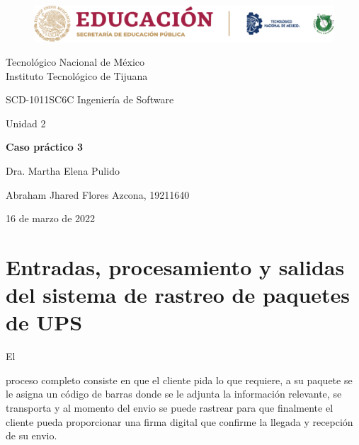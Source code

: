 \documentclass[stu, 12pt, letterpaper, donotrepeattitle, floatsintext, natbib]{apa7}
\begin{document}
    \begin{titlepage}
        \begin{figure}[ht]
            \centering
            \includegraphics[width=15cm]{logosITT.png}
        \end{figure}
        \centering
        {\Large Tecnológico Nacional de México\\Instituto Tecnológico de Tijuana\par}
        \vspace{1cm}
        {\Large SCD-1011SC6C Ingeniería de Software\par}
        \vspace{1cm}
        {\Large Unidad 2\par}
        \vspace{2cm}
        {\Large\bfseries Caso práctico 3\par}
        \vspace{2cm}
        {\large Dra. Martha Elena Pulido\par}
        \vfill
            {\large Abraham Jhared Flores Azcona, 19211640\par}
        \vfill
        {\large 16 de marzo de 2022}
    \end{titlepage}

\renewcommand\contentsname{Contenido}
\tableofcontents

\newpage
\section{Entradas, procesamiento y salidas del sistema de rastreo de paquetes de UPS}
El \begin{justifying}
   proceso completo consiste en que el cliente pida lo que requiere, a su paquete se le asigna
   un código de barras donde se le adjunta la información relevante, se transporta y al momento
   del envio se puede rastrear para que finalmente el cliente pueda proporcionar una firma digital 
   que confirme la llegada y recepción de su envio.\par
\end{justifying}
\vspace{\baselineskip}
\end{document}
